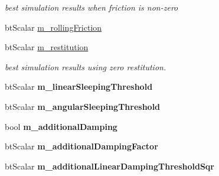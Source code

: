 \begin{DoxyCompactItemize}
\begin{DoxyCompactList}\small\item\em best simulation results when friction is non-\/zero \end{DoxyCompactList}\item 
bt\+Scalar \hyperlink{structbt_rigid_body_1_1bt_rigid_body_construction_info_abb72d0a00d035d2224a927810e9ed972}{m\+\_\+rolling\+Friction}
\item 
\hypertarget{structbt_rigid_body_1_1bt_rigid_body_construction_info_a4cee9df6cc734b50e0ef7c7a4eeb43d8}{bt\+Scalar \hyperlink{structbt_rigid_body_1_1bt_rigid_body_construction_info_a4cee9df6cc734b50e0ef7c7a4eeb43d8}{m\+\_\+restitution}}\label{structbt_rigid_body_1_1bt_rigid_body_construction_info_a4cee9df6cc734b50e0ef7c7a4eeb43d8}

\begin{DoxyCompactList}\small\item\em best simulation results using zero restitution. \end{DoxyCompactList}\item 
\hypertarget{structbt_rigid_body_1_1bt_rigid_body_construction_info_a382486eb29c274813a5c94abe362fb43}{bt\+Scalar {\bfseries m\+\_\+linear\+Sleeping\+Threshold}}\label{structbt_rigid_body_1_1bt_rigid_body_construction_info_a382486eb29c274813a5c94abe362fb43}

\item 
\hypertarget{structbt_rigid_body_1_1bt_rigid_body_construction_info_ad594f539db30c73497825a5e1d48c553}{bt\+Scalar {\bfseries m\+\_\+angular\+Sleeping\+Threshold}}\label{structbt_rigid_body_1_1bt_rigid_body_construction_info_ad594f539db30c73497825a5e1d48c553}

\item 
\hypertarget{structbt_rigid_body_1_1bt_rigid_body_construction_info_a0f229267a8bd1018fc097d61c24f842b}{bool {\bfseries m\+\_\+additional\+Damping}}\label{structbt_rigid_body_1_1bt_rigid_body_construction_info_a0f229267a8bd1018fc097d61c24f842b}

\item 
\hypertarget{structbt_rigid_body_1_1bt_rigid_body_construction_info_ac6d2e032902d110c82582c6a32e4e0f9}{bt\+Scalar {\bfseries m\+\_\+additional\+Damping\+Factor}}\label{structbt_rigid_body_1_1bt_rigid_body_construction_info_ac6d2e032902d110c82582c6a32e4e0f9}

\item 
\hypertarget{structbt_rigid_body_1_1bt_rigid_body_construction_info_a9ad11b15b26da0273510452bcb120d58}{bt\+Scalar {\bfseries m\+\_\+additional\+Linear\+Damping\+Threshold\+Sqr}}\label{structbt_rigid_body_1_1bt_rigid_body_construction_info_a9ad11b15b26da0273510452bcb120d58}


\end{DoxyCompactItemize}
